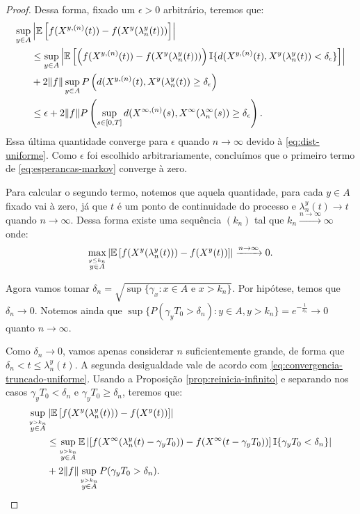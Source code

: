 \begin{proof}
  Dessa forma, fixado um $\epsilon > 0$ arbitrário, teremos que:
  \begin{align*}
    \sup_{y\in A}& \left\lvert {\mathbb{E}} \left[ f(X^{y,(n)}(t)) -
        f(X^{y}(\lambda_n^y(t))) \right]
    \right\rvert\\
    &\leq \sup_{y\in A} \left\lvert {\mathbb{E}} \left[ \left(f(X^{y,(n)}(t)) -
          f(X^{y}(\lambda_n^y(t))) \right) {\mathbb{I}}\{ d(X^{y, (n)}(t),
        X^y(\lambda_n^y(t)) < \delta_\epsilon \} \right]
    \right\rvert \\
    &+ 2\Vert f \Vert \sup_{y \in A} P\left( d(X^{y, (n)}(t),
      X^y(\lambda_n^y(t)) \geq
      \delta_\epsilon \right) \\
    &\leq \epsilon + 2 \Vert f \Vert P \left( \sup_{s \in [0,
        T]}d(X^{\infty, (n)}(s), X^\infty(\lambda_n^\infty(s)) \geq
      \delta_\epsilon \right).
  \end{align*}
  Essa última quantidade converge para $\epsilon$ quando $n\to \infty$
  devido à \eqref{eq:dist-uniforme}. Como $\epsilon$ foi escolhido
  arbitrariamente, concluímos que o primeiro termo de
  \eqref{eq:esperancas-markov} converge à zero.

  Para calcular o segundo termo, notemos que aquela quantidade, para
  cada $y \in A$ fixado vai à zero, já que $t$ é \qc um ponto de
  continuidade do processo e $\lambda_n^y(t) \to t$ quando
  $n\to\infty$. Dessa forma existe uma sequência $(k_n)$ tal que $k_n
  \xrightarrow{n\to\infty} \infty$ onde:
  \begin{displaymath}
      \max_{\stackrel{y \leq k_n}{y\in A}} \left\lvert
      {\mathbb{E}} \left[f(X^y(\lambda_n^y(t))) - f(X^y(t)) \right]
    \right\rvert \xrightarrow{n\to \infty} 0.
  \end{displaymath}

  Agora vamos tomar $\delta_n = \sqrt{\sup\{ \gamma_x: x \in A
    \textrm{ e } x > k_n\}}$. Por hipótese, temos que $\delta_n \to
  0$. Notemos ainda que $\sup \{ P(\gamma_y T_0 > \delta_n) : y \in A, y
  > k_n \} = e^{-\frac{1}{\delta_n}} \to 0$ quanto $n \to \infty$.

  Como $\delta_n \to 0$, vamos apenas considerar $n$ suficientemente
  grande, de forma que $\delta_n < t \leq \lambda_n^y(t)$. A segunda
  desigualdade vale de acordo com
  \eqref{eq:convergencia-truncado-uniforme}. Usando a Proposição
  \ref{prop:reinicia-infinito} e separando nos casos $\gamma_yT_0 <
  \delta_n$ e $\gamma_yT_0 \geq \delta_n$, teremos que:
  \begin{align}
    \label{eq:markov-quase-la}
    \sup_{\stackrel{y > k_n}{y \in A}}& \left\lvert {\mathbb{E}} \left[f(X^y(\lambda_n^y(t))) -
        f(X^y(t)) \right]
    \right\rvert \notag \\
    &\leq \sup_{\stackrel{y > k_n}{y \in A}} {\mathbb{E}} \left\lvert
      \left[f(X^\infty(\lambda_n^y(t)-\gamma_yT_0)) -
        f(X^\infty(t-\gamma_yT_0)) \right] {\mathbb{I}}\{ \gamma_yT_0 <
      \delta_n \}
    \right\rvert\\
    &+ 2 \Vert f \Vert \sup_{\stackrel{y > k_n}{y \in A}} P(\gamma_y T_0 > \delta_n).
    \notag
  \end{align}


\end{proof}
